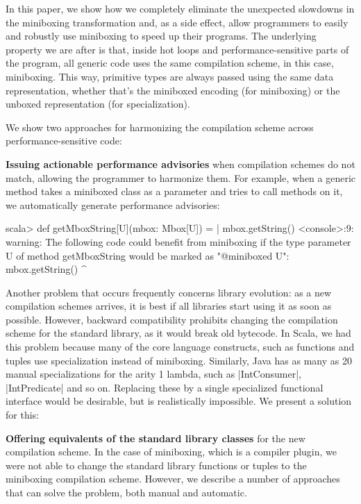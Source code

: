 In this paper, we show how we completely eliminate the unexpected slowdowns in the miniboxing transformation and, as a side effect, allow programmers to easily and robustly use miniboxing to speed up their programs. The underlying property we are after is that, inside hot loops and performance-sensitive parts of the program, all generic code uses the same compilation scheme, in this case, miniboxing. This way, primitive types are always passed using the same data representation, whether that's the miniboxed encoding (for miniboxing) or the unboxed representation (for specialization).

We show two approaches for harmonizing the compilation scheme across performance-sensitive code:

\textbf{Issuing actionable performance advisories} when compilation schemes do not match, allowing the programmer to harmonize them. For example, when a generic method takes a miniboxed class as a parameter and tries to call methods on it, we automatically generate performance advisories:

\begin{lstlisting-nobreak-nolang}
scala> def getMboxString[U](mbox: Mbox[U]) =
     |      mbox.getString()
<console>:9: warning: The following code could benefit from miniboxing if the type parameter U of method getMboxString would be marked as "@miniboxed U":
         mbox.getString()
               ^
\end{lstlisting-nobreak-nolang}

Another problem that occurs frequently concerns library evolution: as a new compilation schemes arrives, it is best if all libraries start using it as soon as possible. However, backward compatibility prohibits changing the compilation scheme for the standard library, as it would break old bytecode. In Scala, we had this problem because many of the core language constructs, such as functions and tuples use specialization instead of miniboxing. Similarly, Java has as many as 20 manual specializations for the arity 1 lambda, such as |IntConsumer|, |IntPredicate| and so on. Replacing these by a single specialized functional interface would be desirable, but is realistically impossible. We present a solution for this:

\textbf{Offering equivalents of the standard library classes} for the new compilation scheme. In the case of miniboxing, which is a compiler plugin, we were not able to change the standard library functions or tuples to the miniboxing compilation scheme. However, we describe a number of approaches that can solve the problem, both manual and automatic.

